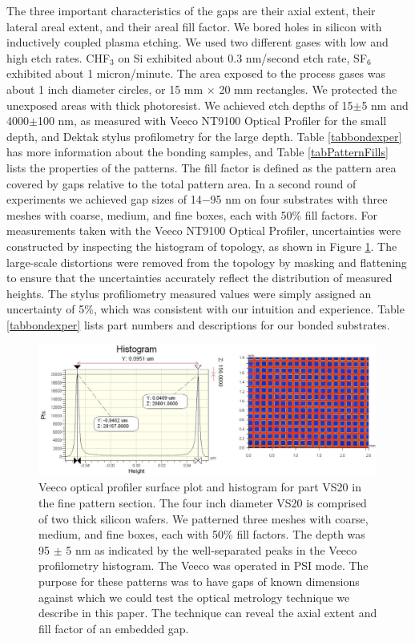 \documentclass[osajnl,preprint,showpacs,superscriptaddress,12pt]{revtex4-1} %
\begin{document}
The three important characteristics of the gaps are their axial extent, their lateral areal extent, and their areal fill factor.  We bored holes in silicon with inductively coupled plasma etching.  We used two different gases with low and high etch rates.  CHF$_3$ on Si exhibited about 0.3 nm/second etch rate, SF$_6$ exhibited about 1 micron/minute.  The area exposed to the process gases was about 1 inch diameter circles, or 15 mm $\times$ 20 mm rectangles.  We protected the unexposed areas with thick photoresist.  We achieved etch depths of 15$\pm$5 nm and 4000$\pm$100 nm, as measured with Veeco NT9100 Optical Profiler for the small depth, and Dektak stylus profilometry for the large depth.  Table \ref{tabbondexper} has more information about the bonding samples, and Table \ref{tabPatternFills} lists the properties of the patterns.  The fill factor is defined as the pattern area covered by gaps relative to the total pattern area.  In a second round of experiments we achieved gap sizes of 14$-$95 nm on four substrates with three meshes with coarse, medium, and fine boxes, each with 50\% fill factors.  For measurements taken with the Veeco NT9100 Optical Profiler, uncertainties were constructed by inspecting the histogram of topology, as shown in Figure \ref{figVS20pattern}.  The large-scale distortions were removed from the topology by masking and flattening to ensure that the uncertainties accurately reflect the distribution of measured heights.  The stylus profiliometry measured values were simply assigned an uncertainty of 5\%, which was consistent with our intuition and experience.  Table \ref{tabbondexper} lists part numbers and descriptions for our bonded substrates.

\begin{figure}[htbp]
\centerline{\includegraphics[width=1.0\columnwidth]{figs/VS20fineGapCrop.pdf}}
\caption{Veeco optical profiler surface plot and histogram for part VS20 in the fine pattern section\label{figVS20pattern}.  The four inch diameter VS20 is comprised of two thick silicon wafers.  We patterned three meshes with coarse, medium, and fine boxes, each with 50\% fill factors.  The depth was 95 $\pm$ 5 nm as indicated by the well-separated peaks in the Veeco profilometry histogram.  The Veeco was operated in PSI mode.  The purpose for these patterns was to have gaps of known dimensions against which we could test the optical metrology technique we describe in this paper.  The technique can reveal the axial extent and fill factor of an embedded gap.  }
\end{figure}
\end{document}
